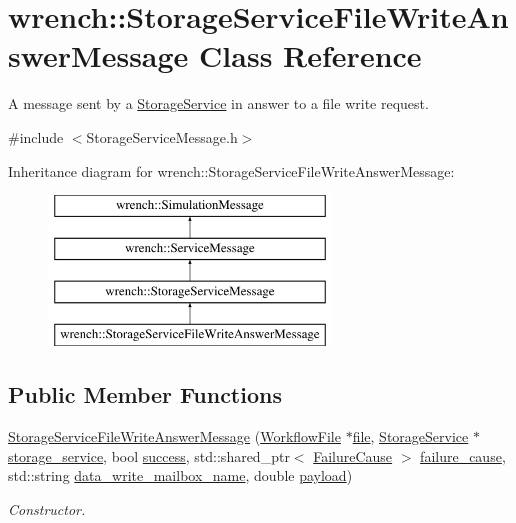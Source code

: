 \hypertarget{classwrench_1_1_storage_service_file_write_answer_message}{}\section{wrench\+:\+:Storage\+Service\+File\+Write\+Answer\+Message Class Reference}
\label{classwrench_1_1_storage_service_file_write_answer_message}


A message sent by a \hyperlink{classwrench_1_1_storage_service}{Storage\+Service} in answer to a file write request.  




{\ttfamily \#include $<$Storage\+Service\+Message.\+h$>$}

Inheritance diagram for wrench\+:\+:Storage\+Service\+File\+Write\+Answer\+Message\+:\begin{figure}[H]
\begin{center}
\leavevmode
\includegraphics[height=4.000000cm]{classwrench_1_1_storage_service_file_write_answer_message}
\end{center}
\end{figure}
\subsection*{Public Member Functions}
\begin{DoxyCompactItemize}
\item 
\hyperlink{classwrench_1_1_storage_service_file_write_answer_message_a96a9062ac69725d994532e9574249ac1}{Storage\+Service\+File\+Write\+Answer\+Message} (\hyperlink{classwrench_1_1_workflow_file}{Workflow\+File} $\ast$\hyperlink{classwrench_1_1_storage_service_file_write_answer_message_aad28a33a71db2fdabb62729f3ecba9f1}{file}, \hyperlink{classwrench_1_1_storage_service}{Storage\+Service} $\ast$\hyperlink{classwrench_1_1_storage_service_file_write_answer_message_ae09094d7178d2c87951e646a5e38a0c8}{storage\+\_\+service}, bool \hyperlink{classwrench_1_1_storage_service_file_write_answer_message_ac9808808da262acae22aa726be7d0b9b}{success}, std\+::shared\+\_\+ptr$<$ \hyperlink{classwrench_1_1_failure_cause}{Failure\+Cause} $>$ \hyperlink{classwrench_1_1_storage_service_file_write_answer_message_a73f09a16c6483f93e8c2703087e4e845}{failure\+\_\+cause}, std\+::string \hyperlink{classwrench_1_1_storage_service_file_write_answer_message_a276f5189ed9540a316d3e08cf417c180}{data\+\_\+write\+\_\+mailbox\+\_\+name}, double \hyperlink{classwrench_1_1_simulation_message_a914f2732713f7c02898e66f05a7cb8a1}{payload})
\begin{DoxyCompactList}\small\item\em Constructor. \end{DoxyCompactList}\end{DoxyCompactItemize}
